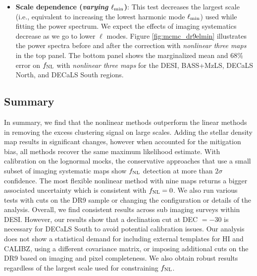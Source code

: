\begin{itemize}[itemindent=*]
\item \textbf{Scale dependence (\textit{varying $\ell_{\rm min}$})}: This test decreases the largest scale (i.e., equivalent to increasing the lowest harmonic mode $\ell_{\rm min}$) used while fitting the power spectrum. We expect the effects of imaging systematics decrease as we go to lower $\ell$ modes. Figure \ref{fig:mcmc_dr9elmin} illustrates the power spectra before and after the correction with \textit{nonlinear three maps} in the top panel. The bottom panel shows the marginalized mean and $68\%$ error on $f_{\rm NL}$ with \textit{nonlinear three maps} for the DESI, BASS+MzLS, DECaLS North, and DECaLS South regions. 

\end{itemize}

\subsection{Summary}
In summary, we find that the nonlinear methods outperform the linear methods in removing the excess clustering signal on large scales. Adding the stellar density map results in significant changes, however when accounted for the mitigation bias, all methods recover the same maximum likelihood estimate. With calibration on the lognormal mocks, the conservative approaches that use a small subset of imaging systematic maps show $f_{\rm NL}$ detection at more than $2\sigma$ confidence. The most flexible nonlinear method with nine maps returns a bigger associated uncertainty which is consistent with $f_{\rm NL}=0$. We also run various tests with cuts on the DR9 sample or changing the configuration or details of the analysis. Overall, we find consistent results across sub imaging surveys within DESI. However, our results show that a declination cut at DEC $=-30$ is necessary for DECaLS South to avoid potential calibration issues. Our analysis does not show a statistical demand for including external templates for HI and CALIBZ, using a different covariance matrix, or imposing additional cuts on the DR9 based on imaging and pixel completeness. We also obtain robust results regardless of the largest scale used for constraining $f_{\rm NL}$.